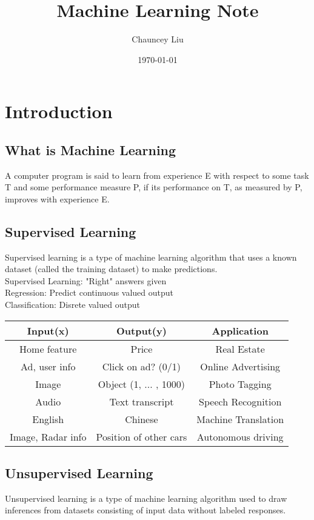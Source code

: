 \documentclass{article}
\title{\textbf{Machine Learning Note}}
\author{Chauncey Liu}
\date{\today}
\begin{document}
 
\maketitle
 
\tableofcontents

\newpage
 
\section{Introduction}
\subsection{What is Machine Learning}
A computer program is said to learn from experience E with respect to some task T and some performance measure P, if its performance on T, as measured by P, improves with experience E.

\subsection{Supervised Learning}
Supervised learning is a type of machine learning algorithm that uses a known dataset (called the training dataset) to make predictions.\\

Supervised Learning: "Right" answers given \\
Regression: Predict continuous valued output \\
Classification: Disrete valued output \\

\begin{tabular}{|c|c|c|} 
  \hline
  Input(x) & Output(y) & Application \\
  \hline
  \hline
  Home feature & Price & Real Estate \\ 
  \hline
  Ad, user info & Click on ad? (0/1) & Online Advertising \\
  \hline
  Image & Object (1, ... , 1000) & Photo Tagging \\
  \hline
  Audio & Text transcript & Speech Recognition \\
  \hline
  English & Chinese & Machine Translation \\ 
  \hline
  Image, Radar info & Position of other cars & Autonomous driving \\
  \hline
\end{tabular}

\subsection{Unsupervised Learning}
Unsupervised learning is a type of machine learning algorithm used to draw inferences from datasets consisting of input data without labeled responses.\\
\end{document}
